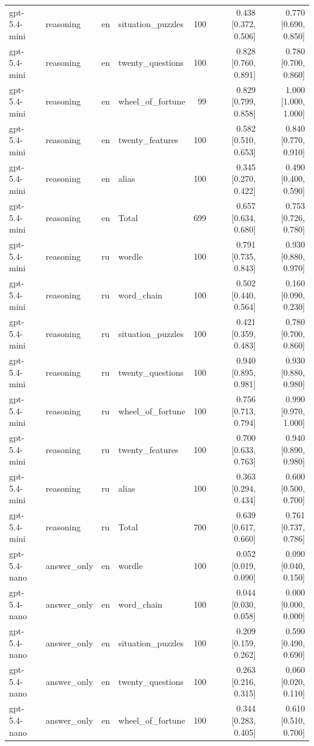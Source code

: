 \begin{longtable}{llllrrr}
gpt-5.4-mini & reasoning & en & situation\_puzzles & 100 & 0.438 [0.372, 0.506] & 0.770 [0.690, 0.850] \\
gpt-5.4-mini & reasoning & en & twenty\_questions & 100 & 0.828 [0.760, 0.891] & 0.780 [0.700, 0.860] \\
gpt-5.4-mini & reasoning & en & wheel\_of\_fortune & 99 & 0.829 [0.799, 0.858] & 1.000 [1.000, 1.000] \\
gpt-5.4-mini & reasoning & en & twenty\_features & 100 & 0.582 [0.510, 0.653] & 0.840 [0.770, 0.910] \\
gpt-5.4-mini & reasoning & en & alias & 100 & 0.345 [0.270, 0.422] & 0.490 [0.400, 0.590] \\
gpt-5.4-mini & reasoning & en & Total & 699 & 0.657 [0.634, 0.680] & 0.753 [0.726, 0.780] \\
gpt-5.4-mini & reasoning & ru & wordle & 100 & 0.791 [0.735, 0.843] & 0.930 [0.880, 0.970] \\
gpt-5.4-mini & reasoning & ru & word\_chain & 100 & 0.502 [0.440, 0.564] & 0.160 [0.090, 0.230] \\
gpt-5.4-mini & reasoning & ru & situation\_puzzles & 100 & 0.421 [0.359, 0.483] & 0.780 [0.700, 0.860] \\
gpt-5.4-mini & reasoning & ru & twenty\_questions & 100 & 0.940 [0.895, 0.981] & 0.930 [0.880, 0.980] \\
gpt-5.4-mini & reasoning & ru & wheel\_of\_fortune & 100 & 0.756 [0.713, 0.794] & 0.990 [0.970, 1.000] \\
gpt-5.4-mini & reasoning & ru & twenty\_features & 100 & 0.700 [0.633, 0.763] & 0.940 [0.890, 0.980] \\
gpt-5.4-mini & reasoning & ru & alias & 100 & 0.363 [0.294, 0.434] & 0.600 [0.500, 0.700] \\
gpt-5.4-mini & reasoning & ru & Total & 700 & 0.639 [0.617, 0.660] & 0.761 [0.737, 0.786] \\
gpt-5.4-nano & answer\_only & en & wordle & 100 & 0.052 [0.019, 0.090] & 0.090 [0.040, 0.150] \\
gpt-5.4-nano & answer\_only & en & word\_chain & 100 & 0.044 [0.030, 0.058] & 0.000 [0.000, 0.000] \\
gpt-5.4-nano & answer\_only & en & situation\_puzzles & 100 & 0.209 [0.159, 0.262] & 0.590 [0.490, 0.690] \\
gpt-5.4-nano & answer\_only & en & twenty\_questions & 100 & 0.263 [0.216, 0.315] & 0.060 [0.020, 0.110] \\
gpt-5.4-nano & answer\_only & en & wheel\_of\_fortune & 100 & 0.344 [0.283, 0.405] & 0.610 [0.510, 0.700] \\

\end{longtable}
